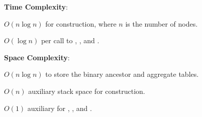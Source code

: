 \textbf{Time Complexity}:
\begin{compactitem}
  \item $O(n \log n)$ for construction, where $n$ is the number of nodes.
  \item $O(\log n)$ per call to , , and .
\end{compactitem}

\textbf{Space Complexity}:
\begin{compactitem}
  \item $O(n \log n)$ to store the binary ancestor and aggregate tables.
  \item $O(n)$ auxiliary stack space for construction.
  \item $O(1)$ auxiliary for , , and .
\end{compactitem}

